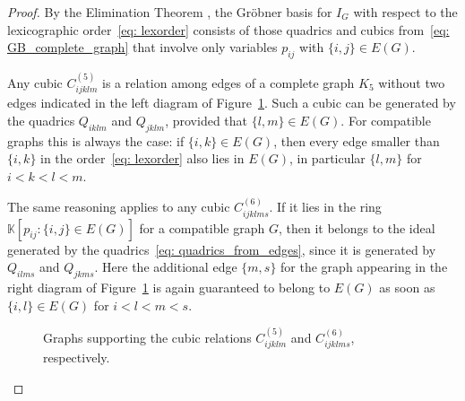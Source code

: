 \documentclass[12pt,a4paper]{amsart}
\def\NZQ{\mathbb}               %
\def\KK{{\NZQ K}}
\theoremstyle{definition}
\begin{document}
\begin{proof}
By the Elimination Theorem \cite[Theorem 1.4.1]{GB2013}, the Gröbner basis for $I_G$ with respect to the lexicographic order~\eqref{eq: lexorder} consists of those quadrics and cubics from~\eqref{eq: GB_complete_graph} that involve only variables $p_{ij}$ with $\{i,j\}\in E(G)$.  

Any cubic $C^{(5)}_{ijklm}$ is a relation among edges of a complete graph $K_5$ without two edges indicated in the left diagram of Figure~\ref{fig: graphs for cubics}. Such a cubic can be generated by the quadrics $Q_{iklm}$ and $Q_{jklm}$, provided that $\{l,m\}\in E(G)$. For compatible graphs this is always the case: if $\{i,k\}\in E(G)$, then every edge smaller than $\{i,k\}$ in the order~\eqref{eq: lexorder} also lies in $E(G)$, in particular $\{l,m\}$ for $i<k<l<m$.  

The same reasoning applies to any cubic $C^{(6)}_{ijklms}$. If it lies in the ring $\KK[p_{ij}:\{i,j\}\in E(G)]$ for a compatible graph $G$, then it belongs to the ideal generated by the quadrics~\eqref{eq: quadrics_from_edges}, since it is generated by $Q_{ilms}$ and $Q_{jkms}$. Here the additional edge $\{m,s\}$ for the graph appearing in the right diagram of Figure~\ref{fig: graphs for cubics} is again guaranteed to belong to $E(G)$ as soon as $\{i,l\}\in E(G)$ for $i<l<m<s$.  
    \begin{figure}
        \centering
\qquad
{}
        \caption{Graphs supporting the cubic relations $C_{ijklm}^{(5)}$ and $C_{ijklms}^{(6)}$, respectively.}
        \label{fig: graphs for cubics}
    \end{figure}
\end{proof}
\end{document}
